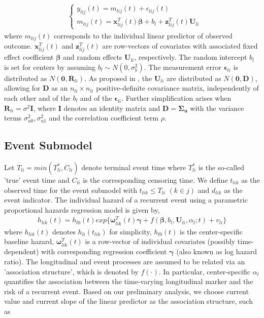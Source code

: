\begin{align}
&  \left \{\begin{array}{ll}
 y_{lij}(t)=m_{lij}(t)+\epsilon_{lij}(t)\\
 m_{lij}(t)=\bm{x}^T_{lij}(t)\bm{\beta}+b_l+\bm{z}^{T}_{lij}(t)\bm{U}_{li}
\end{array}\right.
\end{align}
where $m_{lij}(t)$ corresponds to the individual linear predictor of observed outcome. $\bm{x}^T_{lij}(t)$ and $\bm{z}^T_{lij}(t)$ are row-vectors of covariates with associated fixed effect coefficient $\bm{\beta}$ and random effects $\bm{U}_{li}$, respectively. The random intercept $b_l$ is set for centers by assuming $b_l \sim N(0,\sigma^2_b)$. The measurement error $\bm{\epsilon}_{li}$ is distributed as $N(\bm{0},\bm{R}_{li})$. As proposed in \cite{Laird1982}, the $\bm{U}_{li}$ are distributed as $N(\bm{0},\bm{D})$, allowing for $\bm{D}$ as an $n_{li} \times n_{li}$ positive-definite covariance matrix, independently of each other and of the $b_l$ and of the $\bm{\epsilon}_{li}$. Further simplification arises when $\bm{R}_{li}=\sigma^2\bm{I}$, where $\bm{I}$ denotes an identity matrix and $\bm{D}=\bm{\Sigma_u}$ with the variance terms ${\sigma^2_{u0}, \sigma^2_{u1}}$ and the correlation coefficient term $\rho$. 

\subsection{Event Submodel}

Let $T_{li}=min(T^{*}_{li},C_{li})$ denote terminal event time where $T^{*}_{li}$ is the so-called 'true' event time and $C_{li}$ is the corresponding censoring time. We define $t_{lik}$ as the observed time for the event submodel with $t_{lik} \leq T_{li}$ $(k \in j)$ and $d_{lik}$ as the event indicator. The individual hazard of a recurrent event using a parametric proportional hazards regression model is given by, 
\begin{align}
    h_{lik}(t)=h_{l0}(t)exp\big\{\bm{\omega}^T_{lik}(t)\bm{\gamma}+f(\bm{\beta},b_l,\bm{U}_{li},\alpha_l;t)+v_{li}\big\}
\end{align}
where $h_{lik}(t)$ denotes $h_{li}(t_{lik})$ for simplicity, $h_{l0}(t)$ is the center-specific baseline hazard, $\bm{\omega}^T_{lik}(t)$ is a row-vector of individual covariates (possibly time-dependent) with corresponding regression coefficient $\bm{\gamma}$ (also known as log hazard ratio). The longitudinal and event processes are assumed to be related via an 'association structure', which is denoted by $f(\cdot)$. In particular, center-specific $\alpha_l$ quantifies the association between the time-varying longitudinal marker and the risk of a recurrent event. Based on our preliminary analysis, we choose current value and current slope of the linear predictor as the association structure, such as

